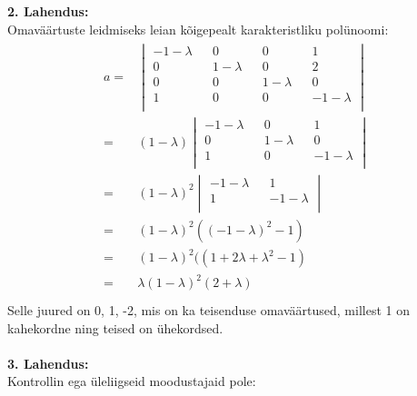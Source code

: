 \documentclass{article}
\begin{document}
\pagebreak
\textbf{2. Lahendus:}\\
Omaväärtuste leidmiseks leian kõigepealt karakteristliku polünoomi:
\begin{gather*}
\begin{aligned}
a=&
\begin{vmatrix}
-1-\lambda && 0 && 0 && 1\\
0 && 1-\lambda && 0 && 2\\
0 && 0 && 1-\lambda && 0\\
1 && 0 && 0 && -1-\lambda\\
\end{vmatrix}\\
=&(1-\lambda)
\begin{vmatrix}
-1-\lambda && 0 && 1\\
0 && 1-\lambda && 0\\
1 &&0 && -1-\lambda\\
\end{vmatrix}\\
=&(1-\lambda)^2
\begin{vmatrix}
-1-\lambda && 1\\
1 && -1-\lambda\\
\end{vmatrix}\\
=&(1-\lambda)^2((-1-\lambda)^2-1)\\
=&(1-\lambda)^2((1+2\lambda+\lambda^2-1)\\
=&\lambda(1-\lambda)^2(2+\lambda)\\
\end{aligned}
\end{gather*}
Selle juured on 0, 1, -2, mis on ka teisenduse omaväärtused, millest 1 on kahekordne ning teised on ühekordsed.\\
\pagebreak\\
\textbf{3. Lahendus:}\\
Kontrollin ega üleliigseid  moodustajaid pole:
\end{document}
